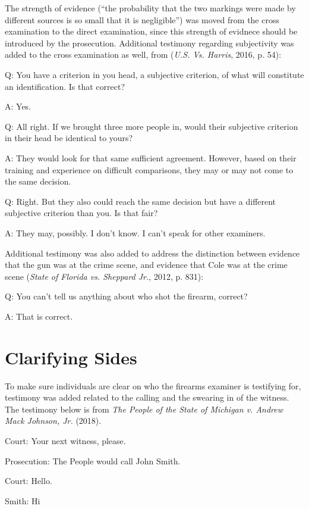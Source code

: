\documentclass[print]{nuthesis}
\begin{document}
The strength of evidence (``the probability that the two markings were made by different sources is so small that it is negligible'') was moved from the cross examination to the direct examination, since this strength of evidnece should be introduced by the prosecution. Additional testimony regarding subjectivity was added to the cross examination as well, from (\emph{{U.S.} Vs. {Harris}}, 2016, p. 54):

Q: You have a criterion in you head, a subjective criterion, of what will constitute an identification. Is that correct?

A: Yes.

Q: All right. If we brought three more people in, would their subjective criterion in their head be identical to yours?

A: They would look for that same sufficient agreement. However, based on their training and experience on difficult comparisons, they may or may not come to the same decision.

Q: Right. But they also could reach the same decision but have a different subjective criterion than you. Is that fair?

A: They may, possibly. I don't know. I can't speak for other examiners.

Additional testimony was also added to address the distinction between evidence that the gun was at the crime scene, and evidence that Cole was at the crime scene (\emph{State of {Florida} vs. Sheppard {Jr.}}, 2012, p. 831):

Q: You can't tell us anything about who shot the firearm, correct?

A: That is correct.

\hypertarget{clarifying-sides}{%
\section{Clarifying Sides}\label{clarifying-sides}}

To make sure individuals are clear on who the firearms examiner is testifying for, testimony was added related to the calling and the swearing in of the witness. The testimony below is from \emph{The {People} of the {State} of {Michigan} v. Andrew {Mack} {Johnson}, {Jr.}} (2018).

Court: Your next witness, please.

Prosecution: The People would call John Smith.

Court: Hello.

Smith: Hi
\end{document}
